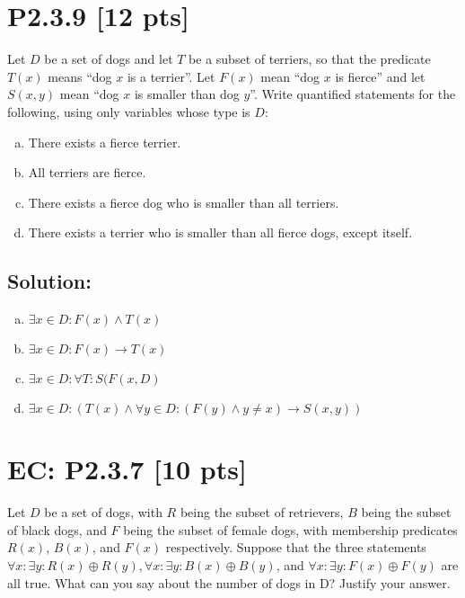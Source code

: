 \documentclass[12pt]{article}
\begin{document}
\newpage
\section*{\textbf{P2.3.9} [12 pts]}
Let $D$ be a set of dogs and let $T$ be a subset of terriers, so that the predicate $T(x)$ means “dog $x$ is a terrier”. Let $F(x)$ mean “dog $x$ is fierce” and let $S(x, y)$ mean “dog $x$ is smaller than dog $y$”. Write quantified statements for the following, using only variables whose type is $D$:

\begin{enumerate}[(a)]
    \item There exists a fierce terrier.

    \item All terriers are fierce.

    \item There exists a fierce dog who is smaller than all terriers.

    \item There exists a terrier who is smaller than all fierce dogs, except itself.

\end{enumerate}


\subsection*{\textbf{Solution:}}
\begin{enumerate}[(a)]
    \item $\exists x \in D: F(x) \land T(x)$

    \item $\exists x \in D: F(x) \rightarrow T(x)$

    \item $\exists x \in D: \forall T:S(F(x,D)$

    \item $\exists x \in D: \left( T(x) \land \forall y \in D: \left( F(y) \land y \neq x \right) \rightarrow S(x, y) \right)$

\end{enumerate}


\newpage
\section*{\textbf{EC: P2.3.7} [10 pts]}
Let $D$ be a set of dogs, with $R$ being the subset of retrievers, $B$ being the subset of black dogs, and $F$ being the subset of female dogs, with membership predicates $R(x)$, $B(x)$, and $F(x)$ respectively. Suppose that the three statements $\forall x: \exists y: R(x) \oplus R(y), \forall x : \exists y : B(x) \oplus B(y)$, and $\forall x: \exists y: F(x) \oplus F(y)$ are all true. What can you say about the number of dogs in D? Justify your answer.
\end{document}
